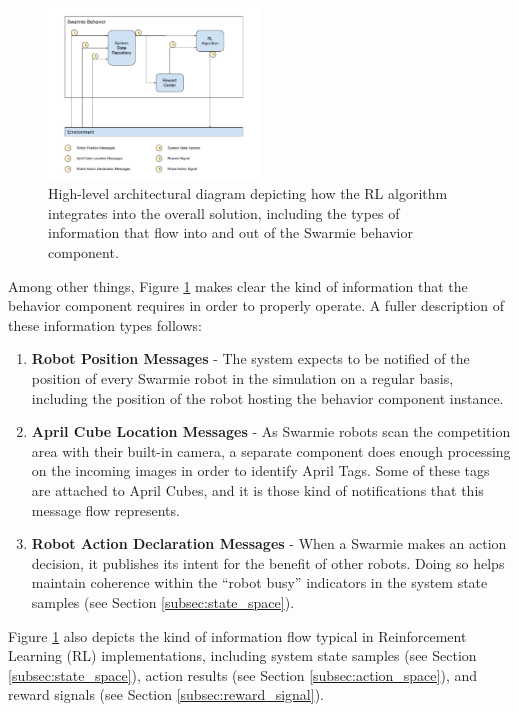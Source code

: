\documentclass[sigconf,authordraft]{acmart}
\begin{document}
\begin{figure}[ht!]
  \centering
  \includegraphics[width=0.5\textwidth]{images/architecture.pdf}
  \caption{High-level architectural diagram depicting how the RL algorithm integrates into the overall solution, including the types of information that flow into and out of the Swarmie behavior component.}
  \label{fig:architecture}
\end{figure}

Among other things, Figure \ref{fig:architecture} makes clear the kind of information that the behavior component requires in order to properly operate. A fuller description of these information types follows:

\begin{enumerate}
  \item \textbf{Robot Position Messages} - The system expects to be notified of the position of every Swarmie robot in the simulation on a regular basis, including the position of the robot hosting the behavior component instance.
  \item \textbf{April Cube Location Messages} - As Swarmie robots scan the competition area with their built-in camera, a separate component does enough processing on the incoming images in order to identify April Tags. Some of these tags are attached to April Cubes, and it is those kind of notifications that this message flow represents.
  \item \textbf{Robot Action Declaration Messages} - When a Swarmie makes an action decision, it publishes its intent for the benefit of other robots. Doing so helps maintain coherence within the ``robot busy'' indicators in the system state samples (see Section \ref{subsec:state_space}).
\end{enumerate}

Figure \ref{fig:architecture} also depicts the kind of information flow typical in Reinforcement Learning (RL) implementations, including system state samples (see Section \ref{subsec:state_space}), action results (see Section \ref{subsec:action_space}), and reward signals (see Section \ref{subsec:reward_signal}).
\end{document}
